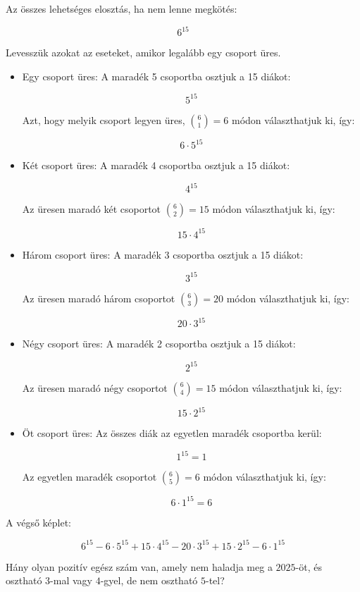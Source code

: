 \begin{solution}
Az összes lehetséges elosztás, ha nem lenne megkötés:

\[
6^{15}
\]

Levesszük azokat az eseteket, amikor legalább egy csoport üres.
\begin{itemize}
\item Egy csoport üres: A maradék 5 csoportba osztjuk a 15 diákot:

\[
5^{15}
\]

Azt, hogy melyik csoport legyen üres, $\binom{6}{1}=6$ módon választhatjuk
ki, így:

\[
6\cdot5^{15}
\]

\item Két csoport üres: A maradék 4 csoportba osztjuk a 15 diákot:

\[
4^{15}
\]

Az üresen maradó két csoportot $\binom{6}{2}=15$ módon választhatjuk
ki, így:

\[
15\cdot4^{15}
\]

\item Három csoport üres: A maradék 3 csoportba osztjuk a 15 diákot:

\[
3^{15}
\]

Az üresen maradó három csoportot $\binom{6}{3}=20$ módon választhatjuk
ki, így:

\[
20\cdot3^{15}
\]

\item Négy csoport üres: A maradék 2 csoportba osztjuk a 15 diákot:

\[
2^{15}
\]

Az üresen maradó négy csoportot $\binom{6}{4}=15$ módon választhatjuk
ki, így:

\[
15\cdot2^{15}
\]

\item Öt csoport üres: Az összes diák az egyetlen maradék csoportba kerül:

\[
1^{15}=1
\]

Az egyetlen maradék csoportot $\binom{6}{5}=6$ módon választhatjuk
ki, így:

\[
6\cdot1^{15}=6
\]

\end{itemize}
A végső képlet:

\[
6^{15}-6\cdot5^{15}+15\cdot4^{15}-20\cdot3^{15}+15\cdot2^{15}-6\cdot1^{15}
\]
\end{solution}
\begin{extraproblem}
Hány olyan pozitív egész szám van, amely nem haladja meg a $2025$-öt,
és osztható $3$-mal vagy $4$-gyel, de nem osztható $5$-tel? 
\end{extraproblem}


